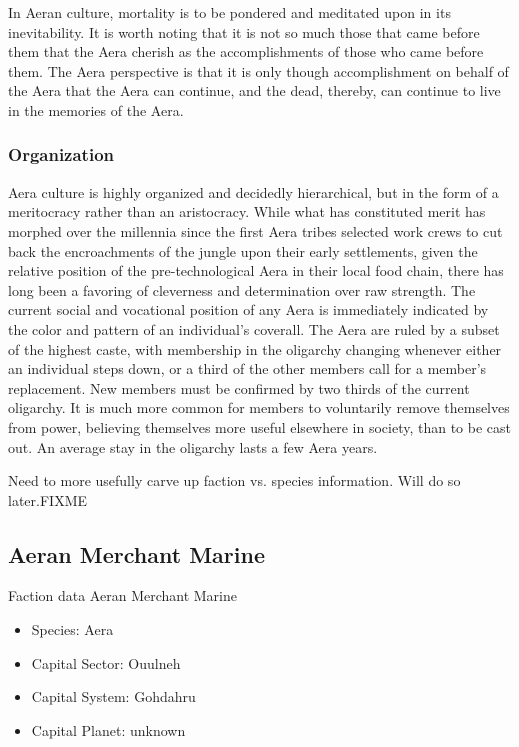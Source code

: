 In Aeran culture, mortality is to be pondered and meditated upon in
its inevitability. It is worth noting that it is not so much those
that came before them that the Aera cherish as the accomplishments of
those who came before them. The Aera perspective is that it is only
though accomplishment on behalf of the Aera that the Aera can
continue, and the dead, thereby, can continue to live in the memories
of the Aera.

\subsubsection{Organization}
Aera culture is highly organized and decidedly hierarchical, but in
the form of a meritocracy rather than an aristocracy. While what has
constituted merit has morphed over the millennia since the first Aera
tribes selected work crews to cut back the encroachments of the jungle
upon their early settlements, given the relative position of the
pre-technological Aera in their local food chain, there has long been
a favoring of cleverness and determination over raw strength. The
current social and vocational position of any Aera is immediately
indicated by the color and pattern of an individual's coverall. The
Aera are ruled by a subset of the highest caste, with membership in
the oligarchy changing whenever either an individual steps down, or a
third of the other members call for a member's replacement. New
members must be confirmed by two thirds of the current oligarchy. It
is much more common for members to voluntarily remove themselves from
power, believing themselves more useful elsewhere in society, than to
be cast out. An average stay in the oligarchy lasts a few Aera years.

Need to more usefully carve up faction vs. species information. Will
do so later.FIXME

\subsection{Aeran Merchant Marine}

Faction data Aeran Merchant Marine
\begin{itemize}
\item Species: Aera
\item Capital Sector: Ouulneh
\item Capital System: Gohdahru
\item Capital Planet: unknown
\end{itemize}


